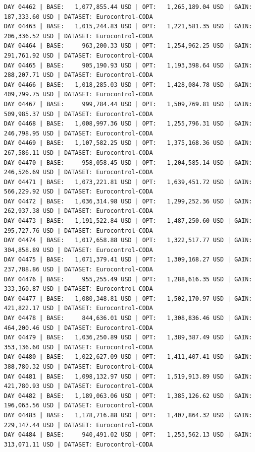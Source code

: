 \documentclass[11pt,a4paper]{article}
\begin{document}
\begin{verbatim}
DAY 04462 | BASE:   1,077,855.44 USD | OPT:   1,265,189.04 USD | GAIN: 187,333.60 USD | DATASET: Eurocontrol-CODA
DAY 04463 | BASE:   1,015,244.83 USD | OPT:   1,221,581.35 USD | GAIN: 206,336.52 USD | DATASET: Eurocontrol-CODA
DAY 04464 | BASE:     963,200.33 USD | OPT:   1,254,962.25 USD | GAIN: 291,761.92 USD | DATASET: Eurocontrol-CODA
DAY 04465 | BASE:     905,190.93 USD | OPT:   1,193,398.64 USD | GAIN: 288,207.71 USD | DATASET: Eurocontrol-CODA
DAY 04466 | BASE:   1,018,285.03 USD | OPT:   1,428,084.78 USD | GAIN: 409,799.75 USD | DATASET: Eurocontrol-CODA
DAY 04467 | BASE:     999,784.44 USD | OPT:   1,509,769.81 USD | GAIN: 509,985.37 USD | DATASET: Eurocontrol-CODA
DAY 04468 | BASE:   1,008,997.36 USD | OPT:   1,255,796.31 USD | GAIN: 246,798.95 USD | DATASET: Eurocontrol-CODA
DAY 04469 | BASE:   1,107,582.25 USD | OPT:   1,375,168.36 USD | GAIN: 267,586.11 USD | DATASET: Eurocontrol-CODA
DAY 04470 | BASE:     958,058.45 USD | OPT:   1,204,585.14 USD | GAIN: 246,526.69 USD | DATASET: Eurocontrol-CODA
DAY 04471 | BASE:   1,073,221.81 USD | OPT:   1,639,451.72 USD | GAIN: 566,229.92 USD | DATASET: Eurocontrol-CODA
DAY 04472 | BASE:   1,036,314.98 USD | OPT:   1,299,252.36 USD | GAIN: 262,937.38 USD | DATASET: Eurocontrol-CODA
DAY 04473 | BASE:   1,191,522.84 USD | OPT:   1,487,250.60 USD | GAIN: 295,727.76 USD | DATASET: Eurocontrol-CODA
DAY 04474 | BASE:   1,017,658.88 USD | OPT:   1,322,517.77 USD | GAIN: 304,858.89 USD | DATASET: Eurocontrol-CODA
DAY 04475 | BASE:   1,071,379.41 USD | OPT:   1,309,168.27 USD | GAIN: 237,788.86 USD | DATASET: Eurocontrol-CODA
DAY 04476 | BASE:     955,255.49 USD | OPT:   1,288,616.35 USD | GAIN: 333,360.87 USD | DATASET: Eurocontrol-CODA
DAY 04477 | BASE:   1,080,348.81 USD | OPT:   1,502,170.97 USD | GAIN: 421,822.17 USD | DATASET: Eurocontrol-CODA
DAY 04478 | BASE:     844,636.01 USD | OPT:   1,308,836.46 USD | GAIN: 464,200.46 USD | DATASET: Eurocontrol-CODA
DAY 04479 | BASE:   1,036,250.89 USD | OPT:   1,389,387.49 USD | GAIN: 353,136.60 USD | DATASET: Eurocontrol-CODA
DAY 04480 | BASE:   1,022,627.09 USD | OPT:   1,411,407.41 USD | GAIN: 388,780.32 USD | DATASET: Eurocontrol-CODA
DAY 04481 | BASE:   1,098,132.97 USD | OPT:   1,519,913.89 USD | GAIN: 421,780.93 USD | DATASET: Eurocontrol-CODA
DAY 04482 | BASE:   1,189,063.06 USD | OPT:   1,385,126.62 USD | GAIN: 196,063.56 USD | DATASET: Eurocontrol-CODA
DAY 04483 | BASE:   1,178,716.88 USD | OPT:   1,407,864.32 USD | GAIN: 229,147.44 USD | DATASET: Eurocontrol-CODA
DAY 04484 | BASE:     940,491.02 USD | OPT:   1,253,562.13 USD | GAIN: 313,071.11 USD | DATASET: Eurocontrol-CODA

\end{verbatim}
\end{document}
